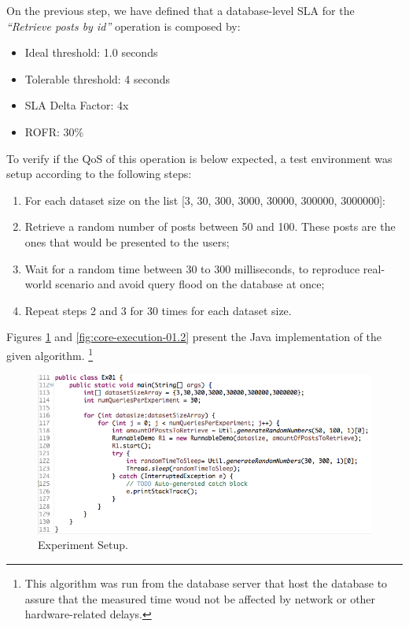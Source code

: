 On the previous step, we have defined that a database-level SLA for the \textit{``Retrieve posts by id''} operation is composed by: 

\begin{itemize}
	\item{Ideal threshold: 1.0 seconds}
	\item{Tolerable threshold: 4 seconds}
	\item{SLA Delta Factor: 4x}
	\item{ROFR: 30\%}
\end{itemize}

To verify if the QoS of this operation is below expected, a test environment was setup according to the following steps: 

\begin{enumerate}
\item{For each dataset size on the list [3, 30, 300, 3000, 30000, 300000, 3000000]: }
\item{Retrieve a random number of posts between 50 and 100. These posts are the ones that would be presented to the users;}
\item{Wait for a random time between 30 to 300 milliseconds, to reproduce real-world scenario and avoid	query flood on the database at once;}
\item{Repeat steps 2 and 3 for 30 times for each dataset size.}
\end{enumerate}


Figures \ref{fig:core-execution-01} and \ref{fig:core-execution-01.2} present the Java implementation of the given algorithm. \footnote{This algorithm was run from the database server that host the database to assure that the measured time woud not be affected by network or other hardware-related delays.}


\begin{figure}[ht!]
\centering
\includegraphics[width=120mm]{Imagens/core-execution-01-1.png}
\caption{Experiment Setup. \label{fig:core-execution-01}}
\end{figure}

